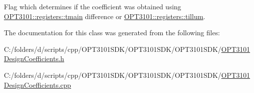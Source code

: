 Flag which determines if the coefficient was obtained using \mbox{\hyperlink{class_o_p_t3101_1_1registers_a3dfd8d81d4cb04d274007deb7c6122fc}{O\+P\+T3101\+::registers\+::tmain}} difference or \mbox{\hyperlink{class_o_p_t3101_1_1registers_a8a097a41ecdf2b98226c4a3a92121c12}{O\+P\+T3101\+::registers\+::tillum}}. 



The documentation for this class was generated from the following files\+:\begin{DoxyCompactItemize}
\item 
C\+:/folders/d/scripts/cpp/\+O\+P\+T3101\+S\+D\+K/\+O\+P\+T3101\+S\+D\+K/\+O\+P\+T3101\+S\+D\+K/\mbox{\hyperlink{_o_p_t3101_design_coefficients_8h}{O\+P\+T3101\+Design\+Coefficients.\+h}}\item 
C\+:/folders/d/scripts/cpp/\+O\+P\+T3101\+S\+D\+K/\+O\+P\+T3101\+S\+D\+K/\+O\+P\+T3101\+S\+D\+K/\mbox{\hyperlink{_o_p_t3101_design_coefficients_8cpp}{O\+P\+T3101\+Design\+Coefficients.\+cpp}}\end{DoxyCompactItemize}
